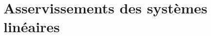 \chapter[Asservissements Linéaires]{Asservissements des systèmes 
linéaires\label{chap-asservis}}
\minitoc
\newpage
